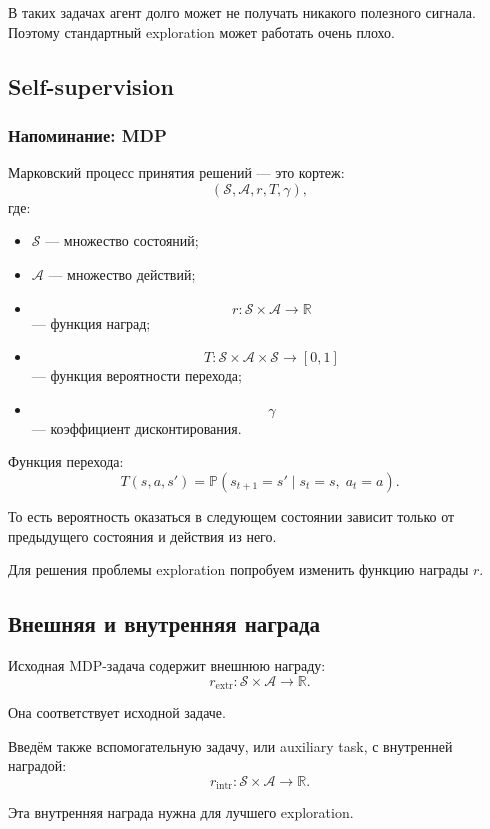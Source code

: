 \documentclass[12pt,a4paper]{article}
\begin{document}
В таких задачах агент долго может не получать никакого полезного сигнала. Поэтому стандартный exploration может работать очень плохо.

\subsection{Self-supervision}

\subsubsection{Напоминание: MDP}

Марковский процесс принятия решений --- это кортеж:
\[
(\mathcal S,\mathcal A,r,T,\gamma),
\]
где:
\begin{itemize}
    \item $\mathcal S$ --- множество состояний;
    \item $\mathcal A$ --- множество действий;
    \item
    \[
    r:\mathcal S\times\mathcal A\to\mathbb R
    \]
    --- функция наград;
    \item
    \[
    T:\mathcal S\times\mathcal A\times\mathcal S\to[0,1]
    \]
    --- функция вероятности перехода;
    \item
    \[
    \gamma
    \]
    --- коэффициент дисконтирования.
\end{itemize}

Функция перехода:
\[
T(s,a,s')
=
\mathbb P(s_{t+1}=s'\mid s_t=s,\;a_t=a).
\]

То есть вероятность оказаться в следующем состоянии зависит только от предыдущего состояния и действия из него.

Для решения проблемы exploration попробуем изменить функцию награды $r$.

\subsection{Внешняя и внутренняя награда}

Исходная MDP-задача содержит внешнюю награду:
\[
r_{\mathrm{extr}}:\mathcal S\times\mathcal A\to\mathbb R.
\]

Она соответствует исходной задаче.

Введём также вспомогательную задачу, или auxiliary task, с внутренней наградой:
\[
r_{\mathrm{intr}}:\mathcal S\times\mathcal A\to\mathbb R.
\]

Эта внутренняя награда нужна для лучшего exploration.
\end{document}
